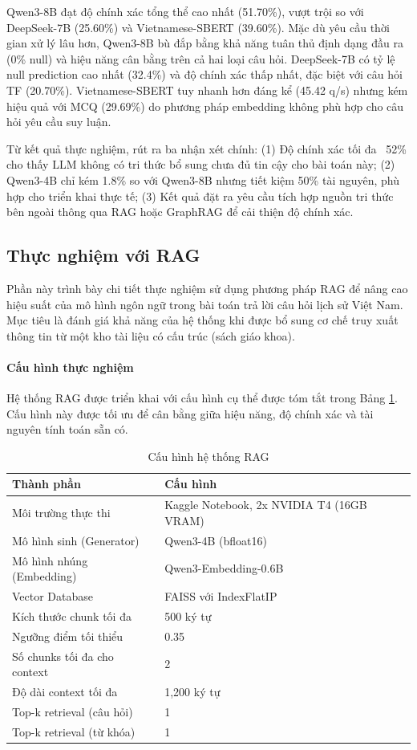 Qwen3-8B đạt độ chính xác tổng thể cao nhất (51.70\%), vượt trội so với DeepSeek-7B (25.60\%) và Vietnamese-SBERT (39.60\%). Mặc dù yêu cầu thời gian xử lý lâu hơn, Qwen3-8B bù đắp bằng khả năng tuân thủ định dạng đầu ra (0\% null) và hiệu năng cân bằng trên cả hai loại câu hỏi. DeepSeek-7B có tỷ lệ null prediction cao nhất (32.4\%) và độ chính xác thấp nhất, đặc biệt với câu hỏi TF (20.70\%). Vietnamese-SBERT tuy nhanh hơn đáng kể (45.42 q/s) nhưng kém hiệu quả với MCQ (29.69\%) do phương pháp embedding không phù hợp cho câu hỏi yêu cầu suy luận.

Từ kết quả thực nghiệm, rút ra ba nhận xét chính: (1) Độ chính xác tối đa ~52\% cho thấy LLM không có tri thức bổ sung chưa đủ tin cậy cho bài toán này; (2) Qwen3-4B chỉ kém 1.8\% so với Qwen3-8B nhưng tiết kiệm 50\% tài nguyên, phù hợp cho triển khai thực tế; (3) Kết quả đặt ra yêu cầu tích hợp nguồn tri thức bên ngoài thông qua RAG hoặc GraphRAG để cải thiện độ chính xác.
\newpage
\subsection{Thực nghiệm với RAG}

Phần này trình bày chi tiết thực nghiệm sử dụng phương pháp RAG để nâng cao hiệu suất của mô hình ngôn ngữ trong bài toán trả lời câu hỏi lịch sử Việt Nam. Mục tiêu là đánh giá khả năng của hệ thống khi được bổ sung cơ chế truy xuất thông tin từ một kho tài liệu có cấu trúc (sách giáo khoa).

\paragraph{Cấu hình thực nghiệm}
Hệ thống RAG được triển khai với cấu hình cụ thể được tóm tắt trong Bảng \ref{tab:rag-config}. Cấu hình này được tối ưu để cân bằng giữa hiệu năng, độ chính xác và tài nguyên tính toán sẵn có.

\begin{table}[H]
\centering
\caption{Cấu hình hệ thống RAG}
\label{tab:rag-config}
\begin{tabular}{|l|l|}
\hline
\textbf{Thành phần} & \textbf{Cấu hình} \\
\hline
Môi trường thực thi & Kaggle Notebook, 2x NVIDIA T4 (16GB VRAM) \\
Mô hình sinh (Generator) & Qwen3-4B (bfloat16) \\
Mô hình nhúng (Embedding) & Qwen3-Embedding-0.6B \\
Vector Database & FAISS với IndexFlatIP \\
Kích thước chunk tối đa & 500 ký tự \\
Ngưỡng điểm tối thiểu & 0.35 \\
Số chunks tối đa cho context & 2 \\
Độ dài context tối đa & 1,200 ký tự \\
Top-k retrieval (câu hỏi) & 1 \\
Top-k retrieval (từ khóa) & 1 \\
\hline
\end{tabular}
\end{table}

